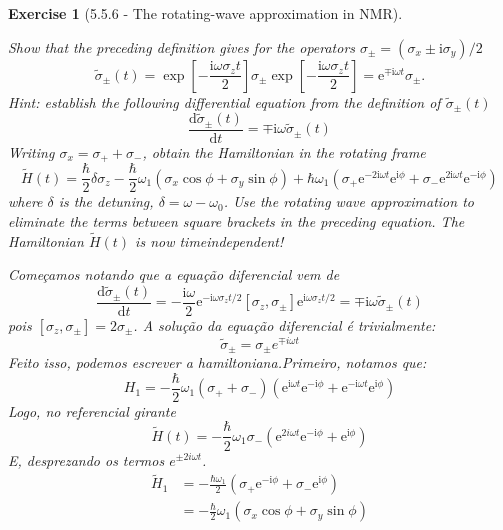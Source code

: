 \documentclass[12pt]{article}
\def\be{\begin{equation}}
\def\ee{\end{equation}}
\newtheorem{exercise}{Exercise}
\begin{document}
\begin{exercise}[5.5.6 - The rotating-wave approximation in NMR]
\begin{exercises}
			\item Show that the preceding definition gives for the operators $\sigma_{ \pm}=\left(\sigma_{x} \pm \mathrm{i} \sigma_{y}\right) / 2$
			$$
			\tilde{\sigma}_{ \pm}(t)=\exp \left[-\frac{\mathrm{i} \omega \sigma_{z} t}{2}\right] \sigma_{ \pm} \exp \left[-\frac{\mathrm{i} \omega \sigma_{z} t}{2}\right]=\mathrm{e}^{\mp \mathrm{i} \omega t} \sigma_{ \pm} .
			$$
			Hint: establish the following differential equation from the definition of $\tilde{\sigma}_{ \pm}(t)$
			$$
			\frac{\mathrm{d} \tilde{\sigma}_{ \pm}(t)}{\mathrm{d} t}=\mp \mathrm{i} \omega \tilde{\sigma}_{ \pm}(t)
			$$
			Writing $\sigma_{x}=\sigma_{+}+\sigma_{-}$, obtain the Hamiltonian in the rotating frame
			$$
			\tilde{H}(t)=\frac{\hbar}{2} \delta \sigma_{z}-\frac{\hbar}{2} \omega_{1}\left(\sigma_{x} \cos \phi+\sigma_{y} \sin \phi\right)+\hbar \omega_{1}\left(\sigma_{+} \mathrm{e}^{-2 \mathrm{i} \omega t} \mathrm{e}^{\mathrm{i} \phi}+\sigma_{-} \mathrm{e}^{2 \mathrm{i} \omega t} \mathrm{e}^{-\mathrm{i} \phi}\right)
			$$
			where $\delta$ is the detuning, $\delta=\omega-\omega_{0}$. Use the rotating wave approximation to eliminate the terms between square brackets in the preceding equation. The Hamiltonian $\tilde{H}(t)$ is now timeindependent!
			\begin{multianswer}
				Começamos notando que a equação diferencial vem de
				\be
					\frac{\mathrm{d} \tilde{\sigma}_{ \pm}(t)}{\mathrm{d} t}=-\frac{\mathrm{i} \omega}{2} \mathrm{e}^{-\mathrm{i} \omega \sigma_z t / 2}\left[\sigma_z, \sigma_{ \pm}\right] \mathrm{e}^{\mathrm{i} \omega \sigma_z t / 2}=\mp \mathrm{i} \omega \tilde{\sigma}_{ \pm}(t)
				\ee
				pois $[\sigma_z, \sigma_\pm] = 2\sigma_\pm$. A solução da equação diferencial é trivialmente:
				\be
					\tilde{\sigma}_\pm = \sigma_\pm e^{\mp i\omega t}
				\ee
				Feito isso, podemos escrever a hamiltoniana.Primeiro, notamos que:
				\be
					H_1=-\frac{\hbar}{2} \omega_1\left(\sigma_{+}+\sigma_{-}\right)\left(\mathrm{e}^{\mathrm{i} \omega t} \mathrm{e}^{-\mathrm{i} \phi}+\mathrm{e}^{-\mathrm{i} \omega t} \mathrm{e}^{\mathrm{i} \phi}\right)
				\ee
				Logo, no referencial girante
				\be
					\tilde{H}(t) = -\frac{\hbar}{2} \omega_1 \sigma_{-}\left(\mathrm{e}^{2 i \omega t} \mathrm{e}^{-\mathrm{i} \phi}+\mathrm{e}^{\mathrm{i} \phi}\right)
				\ee
				E, desprezando os termos $e^{\pm 2i\omega t}$. 
				\be
					\begin{aligned}
						\tilde{H}_1 & =-\frac{\hbar \omega_1}{2}\left(\sigma_{+} \mathrm{e}^{-\mathrm{i} \phi}+\sigma_{-} \mathrm{e}^{\mathrm{i} \phi}\right) \\
						& =-\frac{\hbar}{2} \omega_1\left(\sigma_x \cos \phi+\sigma_y \sin \phi\right)
					\end{aligned}
				\ee
				
			\end{multianswer}
			
			
		
		\end{exercises}
		
	\end{exercise}
	
\end{document}
